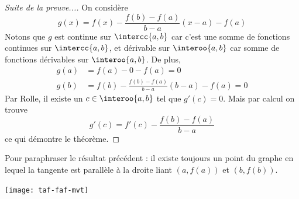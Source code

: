 \begin{frame}
  \begin{proof}[Suite de la preuve...]
    On considère
    \begin{equation*}
      g(x) = f(x) - \frac{f(b)-f(a)}{b-a}(x-a) - f(a)
    \end{equation*}
    Notons que $g$ est continue sur $\intercc{a,b}$ car c'est une somme de fonctions continues sur $\intercc{a,b}$, et dérivable sur $\interoo{a,b}$ car somme de fonctions dérivables sur $\interoo{a,b}$.{} De plus,
    \begin{align*}
      g(a) &= f(a) - 0 - f(a) = 0\\
      g(b) &= f(b) - \frac{f(b)-f(a)}{b-a}(b-a) - f(a) = 0
    \end{align*}\pause
    Par Rolle, il existe un $c \in \interoo{a,b}$ tel que $g'(c) = 0$.\pause{} Mais par calcul on trouve\pause
    \begin{equation*}
      g'(c) = f'(c) - \frac{f(b)-f(a)}{b-a}
    \end{equation*}
    ce qui démontre le théorème.
  \end{proof}
\end{frame}
\begin{frame}%
  \begin{remark}
    Pour paraphraser le résultat précédent : il existe toujours un point du graphe en lequel la tangente est parallèle à la droite liant \((a,f(a))\) et \((b,f(b))\).
  \end{remark}\pause
  \begin{center}
    \texttt{[image: taf-faf-mvt]}
  \end{center}
\end{frame}

